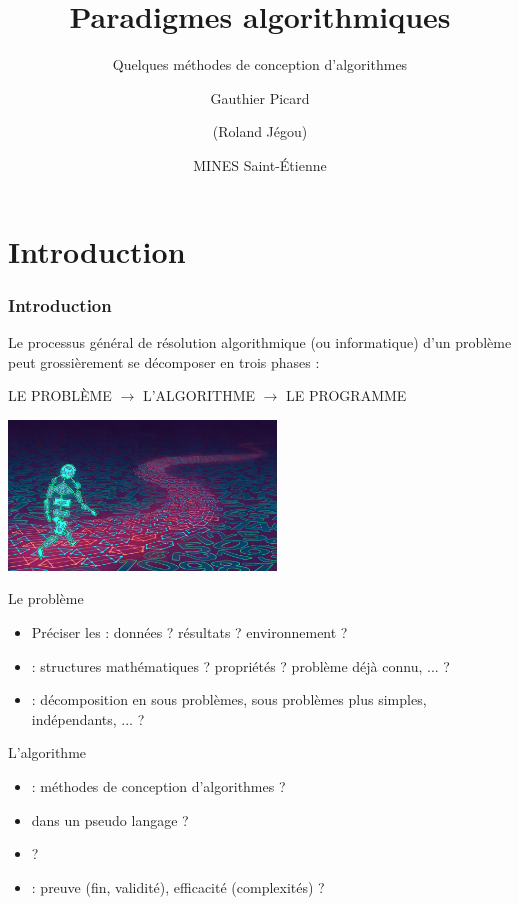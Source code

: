 \documentclass[aspectratio=1610,francais,envcountsect]{beamer}
\title{Paradigmes algorithmiques}
\subtitle{Quelques méthodes de conception d'algorithmes}
\author[Gauthier Picard]{Gauthier Picard \and (Roland Jégou)}
\date{MINES Saint-Étienne}
\begin{document}

{  
  \maketitle
}

\section*{Introduction}

\begin{frame}[allowframebreaks]
  \frametitle{Introduction} Le processus général de résolution
  algorithmique (ou informatique) d'un problème peut grossièrement se
  décomposer en trois phases :

  \begin{center}
    LE PROBLÈME $\to$ L'ALGORITHME $\to$ LE PROGRAMME
  \end{center}

  \bigskip

  \begin{center}
    \includegraphics[height=4cm]{algorithm.jpg}
  \end{center}

  \framebreak

  \begin{block}{Le problème}
    \begin{itemize}
    \item Préciser les  : données ?
      résultats ?  environnement ?
    \item {} : structures mathématiques ?
      propriétés ? problème déjà connu, ... ?
    \item {} : décomposition en sous
      problèmes, sous problèmes plus simples, indépendants, ... ?
    \end{itemize}
  \end{block}

  \framebreak

  \begin{block}{L'algorithme}
    \begin{itemize}
    \item {} : méthodes de conception
      d'algorithmes ?
    \item {} dans un pseudo langage ?
    \item {} ?
    \item {} : preuve (fin, validité), efficacité
      (complexités) ?
    \end{itemize}
  \end{block}


\end{frame}
\end{document}
